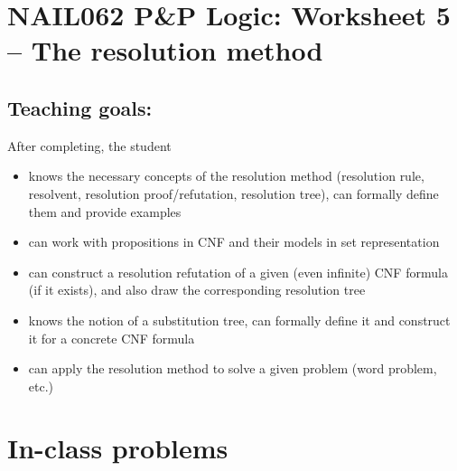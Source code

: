 \section*{NAIL062 P\&P Logic: Worksheet 5 -- The resolution method}


\subsection*{Teaching goals:} After completing, the student

    \begin{itemize}\setlength{\itemsep}{0pt}
        \item knows the necessary concepts of the resolution method (resolution rule, resolvent, resolution proof/refutation, resolution tree), can formally define them and provide examples
        \item can work with propositions in CNF and their models in set representation
        \item can construct a resolution refutation of a given (even infinite) CNF formula (if it exists), and also draw the corresponding resolution tree
        \item knows the notion of a substitution tree, can formally define it and construct it for a concrete CNF formula
        \item can apply the resolution method to solve a given problem (word problem, etc.)
    \end{itemize}
    

\section*{In-class problems}


